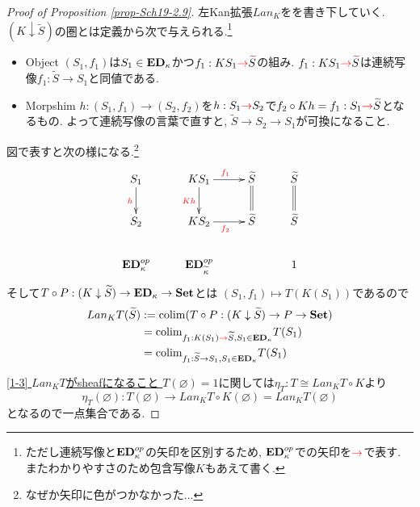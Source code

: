 \documentclass[dvipdfmx,a4paper,11pt]{report}
\newcommand{\colim}{{\rm colim}}
\theoremstyle{definition}
\newcommand{\xr}[1]{\textcolor{red}{#1}}
\begin{document}
\begin{proof}[Proof of Proposition \ref{prop-Sch19-2.9}]
左Kan拡張$Lan_{K}$をを書き下していく. 
$ (K \downarrow \widetilde{S})$の圏とは定義から次で与えられる.\footnote{ただし連続写像と${\bf ED}_{\kappa}^{op}$の矢印を区別するため, ${\bf ED}_{\kappa}^{op}$での矢印を$\xr{\to}$で表す. またわかりやすさのため包含写像$K$もあえて書く.}
\begin{itemize}
\item Object $(S_1, f_1)$は$S_1 \in {\bf ED}_{\kappa}$かつ$f_1: KS_1 \xr{\to} \widetilde{S}$の組み.
$f_1: KS_1 \xr{\to} \widetilde{S}$は連続写像$f_1 : \widetilde{S} \to S_1$と同値である. 
\item Morpshim $h : (S_1, f_1) \to (S_2, f_2)$を$h : S_1 \xr{\to} S_2$で$f_2 \circ Kh = f_1  : S_1 \xr{\to} \widetilde{S}$となるもの. 
よって連続写像の言葉で直すと, $\widetilde{S} \to S_2 \to S_1$が可換になること. 
\end{itemize}
 図で表すと次の様になる.\footnote{なぜか矢印に色がつかなかった...}
\begin{equation*}
\xymatrix@C=25pt@R=20pt{
S_1\ar@{->}[d] _{\xr{h}}
&KS_1\ar@{->}[d]_{\xr{Kh}}  \ar@{->}[r]^{\xr{f_1}} 
& \widetilde{S}\ar@{=}[d]
&\widetilde{S}\ar@{=}[d]
\\
S_2
&KS_2 \ar@{->}[r]_{\xr{f_2}} 
&\widetilde{S}
&\widetilde{S}
 \\   
{\bf ED}_{\kappa}^{op}
&{\bf ED}_{\widetilde{\kappa}}^{op}
&
&1 
\\   
}
\end{equation*}
そして$T \circ P : (K \downarrow \widetilde{S}) \to {\bf ED}_{\kappa} \to {\bf Set}$とは
$(S_1, f_1) \mapsto T(K(S_1))$であるので
\begin{align*}
\begin{split}
Lan_{K}T (\widetilde{S})
&:=
\colim(T \circ P : (K \downarrow \widetilde{S}) \to P \to {\bf Set})\\
&=
\colim_{f_1: K(S_1) \xr{\to} \widetilde{S}, S_1 \in  {\bf ED}_{\kappa} }T(S_1)\\
&=
\colim_{f_1 : \widetilde{S} \to S_1, S_1 \in  {\bf ED}_{\kappa}}T(S_1) \\
\end{split}
\end{align*}

\underline{[1-3] $Lan_{K}T$がsheafになること }
$T(\varnothing)=1$に関しては$\eta_{T} : T \cong Lan_{K}T\circ  K$より
$$
\eta_{T}(\varnothing)  : T(\varnothing) \to   Lan_{K}T\circ  K(\varnothing)=Lan_{K}T(\varnothing)
$$
となるので一点集合である.


\end{proof}
\end{document}
